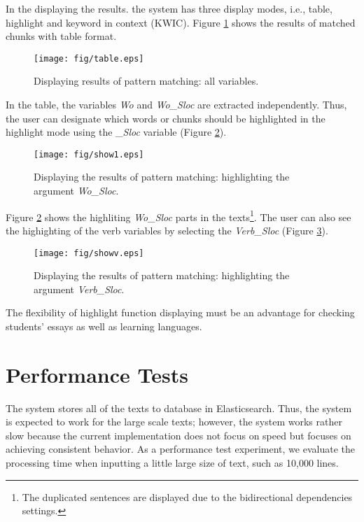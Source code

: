 \documentclass[conference]{IEEEtran}
\begin{document}
In the displaying the results. the system has three display modes, i.e.,
table, highlight and keyword in context (KWIC).
Figure \ref{fig:table} shows the results of matched chunks with table format. 

\begin{figure}[htbp]
\centerline{\texttt{[image: fig/table.eps]}}
\caption{Displaying results of pattern matching: all variables.}
\label{fig:table}
\end{figure}

In the table, the variables {\it Wo} and {\it Wo\_Sloc} are extracted
independently. Thus, the user can designate which words or chunks should be highlighted in
the highlight mode using the {\it \_Sloc} variable (Figure \ref{fig:show1}). 

\begin{figure}[htbp]
\centerline{\texttt{[image: fig/show1.eps]}}
\caption{Displaying the results of pattern matching: highlighting the argument {\it Wo\_Sloc}.}
\label{fig:show1}
\end{figure}

Figure \ref{fig:show1} shows the highliting {\it Wo\_Sloc} parts in the texts\footnote{The duplicated
sentences are displayed due to the bidirectional dependencies settings.}.
The user can also see the highighting of the verb variables by selecting the {\it Verb\_Sloc} (Figure \ref{fig:showv}). 

\begin{figure}[htbp]
\centerline{\texttt{[image: fig/showv.eps]}}
\caption{Displaying the results of pattern matching: highlighting the argument {\it Verb\_Sloc}.}
\label{fig:showv}
\end{figure}

The flexibility of highlight function displaying must be an advantage for checking students' essays as well as
learning languages. 

\section{Performance Tests}
\label{sec:experiment}
The system stores all of the texts to database in Elasticsearch. Thus,
the system is expected to work for the large scale texts; however, the
system works rather slow because the current implementation does not
focus on speed but focuses on achieving consistent behavior.  As a
performance test experiment, we evaluate the processing time when
inputting a little large size of text, such as 10,000 lines.
\end{document}
